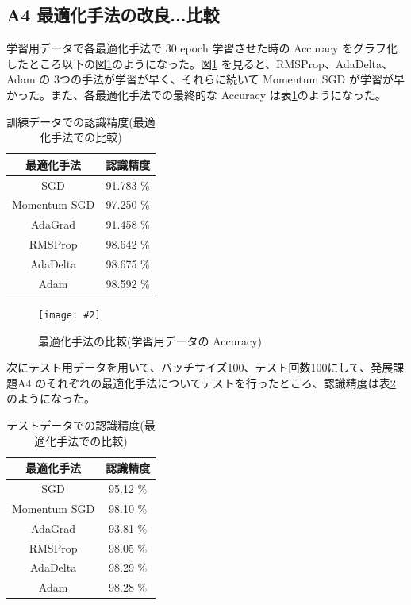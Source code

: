 \documentclass[a4paper,dvipdfmx]{jsarticle}
\newcommand{\image}[3]{
    \begin{figure}[H]
        \begin{center}
        \texttt{[image: \#2]}
        \end{center}
        \caption{#1}
        \label{#3}
    \end{figure}
}
\begin{document}
\subsection*{A4 最適化手法の改良...比較}

学習用データで各最適化手法で 30 epoch 学習させた時の Accuracy をグラフ化したところ以下の図\ref{fig-A4-6-1}のようになった。図\ref{fig-A4-6-1} を見ると、RMSProp、AdaDelta、Adam の 3つの手法が学習が早く、それらに続いて Momentum SGD が学習が早かった。また、各最適化手法での最終的な Accuracy は表\ref{tableA4-6-1}のようになった。

\begin{table}[H]
\begin{center}
\caption{訓練データでの認識精度(最適化手法での比較)}
  \begin{tabular}{|c|c|} \hline
    最適化手法 & 認識精度  \\ \hline \hline
    SGD & 91.783 \% \\ \hline
    Momentum SGD & 97.250 \% \\ \hline
    AdaGrad & 91.458 \% \\ \hline
    RMSProp & 98.642 \% \\ \hline
    AdaDelta & 98.675 \% \\ \hline
    Adam & 98.592 \% \\ \hline
  \end{tabular}
	\label{tableA4-6-1}
\end{center}
\end{table}

\image{最適化手法の比較(学習用データの Accuracy)}{report_a4-6-1.png}{fig-A4-6-1}

次にテスト用データを用いて、バッチサイズ100、テスト回数100にして、発展課題A4 のそれぞれの最適化手法についてテストを行ったところ、認識精度は表\ref{tableA4-6-2} のようになった。

\begin{table}[H]
\begin{center}
\caption{テストデータでの認識精度(最適化手法での比較)}
  \begin{tabular}{|c|c|} \hline
    最適化手法 & 認識精度  \\ \hline \hline
    SGD & 95.12 \% \\ \hline
    Momentum SGD & 98.10 \% \\ \hline
    AdaGrad & 93.81 \% \\ \hline
    RMSProp & 98.05 \% \\ \hline
    AdaDelta & 98.29 \% \\ \hline
    Adam & 98.28 \% \\ \hline
  \end{tabular}
	\label{tableA4-6-2}
\end{center}
\end{table}
\end{document}
